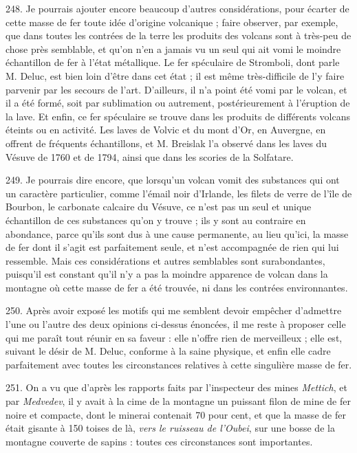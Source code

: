 \documentclass[a4paper, 11pt, oneside, polutonikogreek, french]{article}
\begin{document}
248. Je pourrais ajouter encore beaucoup d'autres considérations, pour écarter de cette masse de fer toute idée d'origine volcanique ; faire observer, par exemple, que dans toutes les contrées de la terre les produits des volcans sont à très-peu de chose près semblable, et qu'on n'en a jamais vu un seul qui ait vomi le moindre échantillon de fer à l'état métallique. Le fer spéculaire de Stromboli, dont parle M. Deluc, est bien loin d'être dans cet état ; il est même très-difficile de l'y faire parvenir par les secours de l'art. D'ailleurs, il n'a point été vomi par le volcan, et il a été formé, soit par sublimation ou autrement, postérieurement à l'éruption de la lave. Et enfin, ce fer spéculaire se trouve dans les produits de différents volcans éteints ou en activité. Les laves de Volvic et du mont d'Or, en Auvergne, en offrent de fréquents échantillons, et M. Breislak l'a observé dans les laves du Vésuve de 1760 et de 1794, ainsi que dans les scories de la Solfatare.

249. Je pourrais dire encore, que lorsqu'un volcan vomit des substances qui ont un caractère particulier, comme l'émail noir d'Irlande, les filets de verre de l'île de Bourbon, le carbonate calcaire du Vésuve, ce n'est pas un seul et unique échantillon de ces substances qu'on y trouve ; ils y sont au contraire en abondance, parce qu'ils sont dus à une cause permanente, au lieu qu'ici, la masse de fer dont il s'agit est parfaitement seule, et n'est accompagnée de rien qui lui ressemble. Mais ces considérations et autres semblables sont surabondantes, puisqu'il est constant qu'il n'y a pas la moindre apparence de volcan dans la montagne où cette masse de fer a été trouvée, ni dans les contrées environnantes.

250. Après avoir exposé les motifs qui me semblent devoir empêcher d'admettre l'une ou l'autre des deux opinions ci-dessus énoncées, il me reste à proposer celle qui me paraît tout réunir en sa faveur : elle n'offre rien de merveilleux ; elle est, suivant le désir de M. Deluc, conforme à la saine physique, et enfin elle cadre parfaitement avec toutes les circonstances relatives à cette singulière masse de fer.

251. On a vu que d'après les rapports faits par l'inspecteur des mines \emph{Mettich}, et par \emph{Medvedev}, il y avait à la cime de la montagne un puissant filon de mine de fer noire et compacte, dont le minerai contenait 70 pour cent, et que la masse de fer était gisante à 150 toises de là, \emph{vers le ruisseau de l'Oubei}, sur une bosse de la montagne couverte de sapins : toutes ces circonstances sont importantes.
\end{document}
